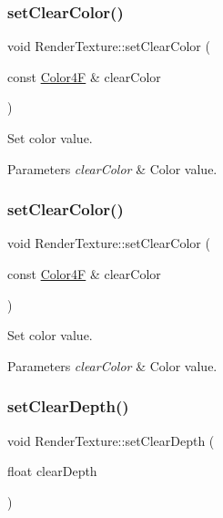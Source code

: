 \subsubsection{\texorpdfstring{set\+Clear\+Color()}{setClearColor()}\hspace{0.1cm}{\footnotesize\ttfamily [1/2]}}
{\footnotesize\ttfamily void Render\+Texture\+::set\+Clear\+Color (\begin{DoxyParamCaption}\item[{const \hyperlink{structColor4F}{Color4F} \&}]{clear\+Color }\end{DoxyParamCaption})\hspace{0.3cm}{\ttfamily [inline]}}

Set color value.


\begin{DoxyParams}{Parameters}
{\em clear\+Color} & Color value. \\
\hline
\end{DoxyParams}
\mbox{\label{classRenderTexture_af4a8bbb32af1b96a23a28389b7c564d6}} 
\subsubsection{\texorpdfstring{set\+Clear\+Color()}{setClearColor()}\hspace{0.1cm}{\footnotesize\ttfamily [2/2]}}
{\footnotesize\ttfamily void Render\+Texture\+::set\+Clear\+Color (\begin{DoxyParamCaption}\item[{const \hyperlink{structColor4F}{Color4F} \&}]{clear\+Color }\end{DoxyParamCaption})\hspace{0.3cm}{\ttfamily [inline]}}

Set color value.


\begin{DoxyParams}{Parameters}
{\em clear\+Color} & Color value. \\
\hline
\end{DoxyParams}
\mbox{\label{classRenderTexture_a7e72dc0bbbbfd010ae3e568bd5675a6f}} 
\subsubsection{\texorpdfstring{set\+Clear\+Depth()}{setClearDepth()}\hspace{0.1cm}{\footnotesize\ttfamily [1/2]}}
{\footnotesize\ttfamily void Render\+Texture\+::set\+Clear\+Depth (\begin{DoxyParamCaption}\item[{float}]{clear\+Depth }\end{DoxyParamCaption})\hspace{0.3cm}{\ttfamily [inline]}}

